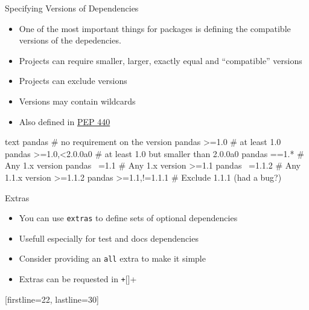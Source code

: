 \begin{frame}[fragile, c]{Specifying Versions of Dependencies}
  \begin{itemize}
    \item One of the most important things for packages is defining the compatible versions
  of the depedencies.
    \item Projects can require smaller, larger, exactly equal and \enquote{compatible} versions
    \item Projects can exclude versions
    \item Versions may contain wildcards
    \item Also defined in \href{https://www.python.org/dev/peps/pep-0440/#version-specifiers}{PEP 440}
  \end{itemize}

  \begin{code}[title={Depedency defintions}]{text}
     pandas                 # no requirement on the version
     pandas >=1.0           # at least 1.0
     pandas >=1.0,<2.0.0a0  # at least 1.0 but smaller than 2.0.0a0
     pandas ==1.*           # Any 1.x version
     pandas ~=1.1           # Any 1.x version >=1.1
     pandas ~=1.1.2         # Any 1.1.x version >=1.1.2
     pandas >=1.1,!=1.1.1   # Exclude 1.1.1 (had a bug?)
  \end{code}
\end{frame}

\begin{frame}[c, fragile]{Extras}
  \begin{itemize}
    \item You can use \texttt{extras} to define sets of optional dependencies
    \item Usefull especially for test and docs dependencies
    \item Consider providing an \texttt{all} extra to make it simple
    \item Extras can be requested in \texttt+[]+
  \end{itemize}

  [firstline=22, lastline=30]
\end{frame}


